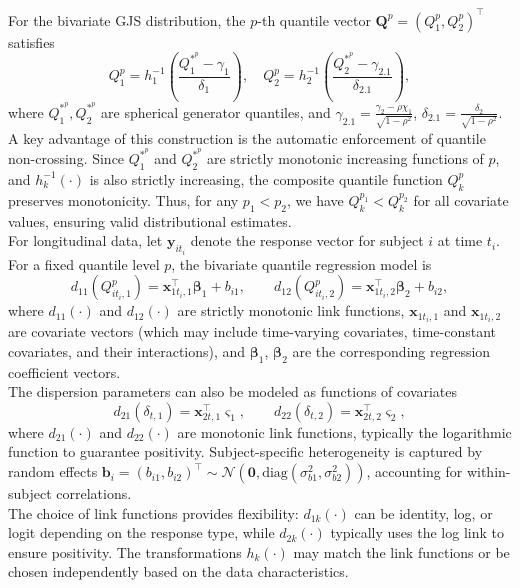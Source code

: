 \documentclass[twoside]{article}
\begin{document}
For the bivariate GJS distribution, the $p$-th quantile vector $\boldsymbol{Q}^{p}=(Q_{1}^{p},Q_{2}^{p})^{\intercal}$ satisfies
\[
Q_{1}^{p}=h_{1}^{-1}\left(\frac{Q_{1}^{\ast^{p}}-\gamma_{1}}{\delta_{1}}\right), \quad
Q_{2}^{p}=h_{2}^{-1}\left(\frac{Q_{2}^{\ast^{p}}-\gamma_{2.1}}{\delta_{2.1}}\right),
\]
where $Q_{1}^{\ast^{p}}, Q_{2}^{\ast^{p}}$ are spherical generator quantiles, and $\gamma_{2.1} = \frac{\gamma_{2}-\rho \chi_{1}}{\sqrt{1-\rho^{2}}}$, $\delta_{2.1} = \frac{\delta_{2}}{\sqrt{1-\rho^{2}}}$. A key advantage of this construction is the automatic enforcement of quantile non-crossing. Since $Q_{1}^{\ast^{p}}$ and $Q_{2}^{\ast^{p}}$ are strictly monotonic increasing functions of $p$, and $h_{k}^{-1}(\cdot)$ is also strictly increasing, the composite quantile function $Q_{k}^{p}$ preserves monotonicity. Thus, for any $p_{1} < p_{2}$, we have $Q_{k}^{p_{1}} < Q_{k}^{p_{2}}$ for all covariate values, ensuring valid distributional estimates.\\
For longitudinal data, let $\boldsymbol{y}_{it_i}$ denote the response vector for subject $i$ at time $t_i$. For a fixed quantile level $p$, the bivariate quantile regression model is
\begin{equation}
	d_{11}(Q_{it_i,1}^{p}) = \boldsymbol{x}_{1t_i,1}^{\intercal}\boldsymbol{\beta}_1 + b_{i1}, \qquad d_{12}(Q_{it_i,2}^{p})  = \boldsymbol{x}_{1t_i,2}^{\intercal}\boldsymbol{\beta}_2 + b_{i2},
\end{equation}
where $d_{11}(\cdot)$ and $d_{12}(\cdot)$ are strictly monotonic link functions, $\boldsymbol{x}_{1t_i,1}$ and $\boldsymbol{x}_{1t_i,2}$ are covariate vectors (which may include time-varying covariates, time-constant covariates, and their interactions), and $\boldsymbol{\beta}_1$, $\boldsymbol{\beta}_2$ are the corresponding regression coefficient vectors.\\
The dispersion parameters can also be modeled as functions of covariates
\begin{equation}
	d_{21}(\delta_{t,1}) = \boldsymbol{x}_{2t,1}^{\intercal}\boldsymbol{\varsigma}_1, \qquad d_{22}(\delta_{t,2}) = \boldsymbol{x}_{2t,2}^{\intercal}\boldsymbol{\varsigma}_2,
\end{equation}
where $d_{21}(\cdot)$ and $d_{22}(\cdot)$ are monotonic link functions, typically the logarithmic function to guarantee positivity. Subject-specific heterogeneity is captured by random effects $\boldsymbol{b}_i = (b_{i1}, b_{i2})^{\intercal} \sim \mathcal{N}(\boldsymbol{0}, \text{diag}(\sigma_{b1}^2, \sigma_{b2}^2))$, accounting for within-subject correlations.\\
The choice of link functions provides flexibility: $d_{1k}(\cdot)$ can be identity, log, or logit depending on the response type, while $d_{2k}(\cdot)$ typically uses the log link to ensure positivity. The transformations $h_k(\cdot)$ may match the link functions or be chosen independently based on the data characteristics.
\end{document}
